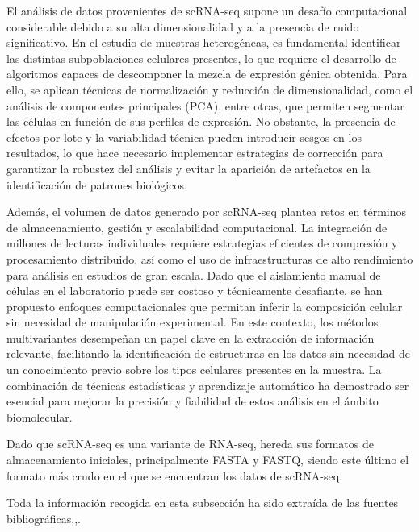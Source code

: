 El análisis de datos provenientes de scRNA-seq supone un desafío computacional considerable debido a su alta dimensionalidad y a la presencia de ruido significativo. 
En el estudio de muestras heterogéneas, es fundamental identificar las distintas subpoblaciones celulares presentes, lo que requiere el desarrollo de algoritmos 
capaces de descomponer la mezcla de expresión génica obtenida. Para ello, se aplican técnicas de normalización y reducción de dimensionalidad, como el análisis 
de componentes principales (PCA), entre otras, que permiten segmentar las células en función de sus perfiles de 
expresión. No obstante, la presencia de efectos por lote y la variabilidad técnica pueden introducir sesgos en los resultados, lo que hace necesario implementar 
estrategias de corrección para garantizar la robustez del análisis y evitar la aparición de artefactos en la identificación de patrones biológicos. \newline

Además, el volumen de datos generado por scRNA-seq plantea retos en términos de almacenamiento, gestión y escalabilidad computacional. La integración de 
millones de lecturas individuales requiere estrategias eficientes de compresión y procesamiento distribuido, así como el uso de infraestructuras de alto 
rendimiento para análisis en estudios de gran escala. Dado que el aislamiento manual de células en el laboratorio puede ser costoso y técnicamente desafiante, 
se han propuesto enfoques computacionales que permitan inferir la composición celular sin necesidad de manipulación experimental. En este contexto, 
los métodos multivariantes desempeñan un papel clave en la extracción de información relevante, facilitando la identificación de estructuras en los datos 
sin necesidad de un conocimiento previo sobre los tipos celulares presentes en la muestra. La combinación de técnicas estadísticas y aprendizaje automático 
ha demostrado ser esencial para mejorar la precisión y fiabilidad de estos análisis en el ámbito biomolecular. \newline


Dado que scRNA-seq es una variante de RNA-seq, hereda sus formatos de almacenamiento iniciales, principalmente FASTA y FASTQ, siendo este último el formato 
más crudo en el que se encuentran los datos de scRNA-seq. %

Toda la información recogida en esta subsección ha sido extraída de las fuentes bibliográficas\cite{transcriptomics-3-scRNA-seq-1},\cite{transcriptomics-3-scRNA-seq-2},\cite{BroadInstitute2019}.